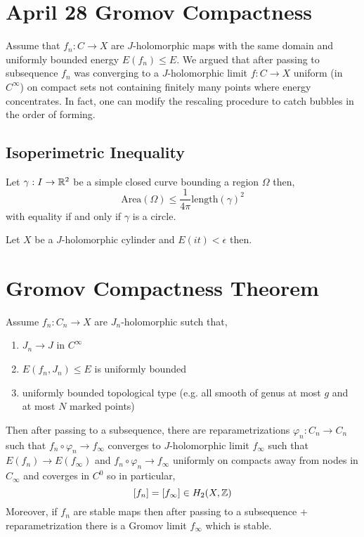 \documentclass[12pt]{article}
\begin{document}
\section{April 28 Gromov Compactness}

Assume that $f_n : C \to X$ are $J$-holomorphic maps with the same domain and uniformly bounded energy $E(f_n) \le E$. We argued that after passing to subsequence $f_n$ was converging to a $J$-holomorphic limit $f : C \to X$ uniform (in $C^\infty$) on compact sets not containing finitely many points where energy concentrates. In fact, one can modify the rescaling procedure to catch bubbles in the order of forming. 

\subsection{Isoperimetric Inequality}

\begin{thm}
Let $\gamma : I \to \mathbb{R}^2$ be a simple closed curve bounding a region $\Omega$ then,
\[ \mathrm{Area}(\Omega) \le \frac{1}{4 \pi} \mathrm{length}(\gamma)^2 \]
with equality if and only if $\gamma$ is a circle.
\end{thm}

\begin{thm}
Let $X$ be a $J$-holomorphic cylinder and $E(it) < \epsilon$ then.
\end{thm}

\section{Gromov Compactness Theorem}

Assume $f_n : C_n \to X$ are $J_n$-holomorphic sutch that,
\begin{enumerate}
\item $J_n \to J$ in $C^\infty$
\item $E(f_n, J_n) \le E$ is uniformly bounded
\item uniformly bounded topological type (e.g. all smooth of genus at most $g$ and at most $N$ marked points)
\end{enumerate}

Then after passing to a subsequence, there are reparametrizations $\varphi_n : C_n \to C_n$ such that $f_n \circ \varphi_n \to f_\infty$ converges to $J$-holomorphic limit $f_\infty$ such that $E(f_n) \to E(f_\infty)$ and $f_n \circ \varphi_n \to f_\infty$ uniformly on compacts away from nodes in $C_\infty$ and coverges in $C^0$ so in particular,
\[ [f_n] = [f_\infty] \in H_2(X, \mathbb{Z}) \]
Moreover, if $f_n$ are stable maps then after passing to a subsequence + reparametrization there is a Gromov limit $f_\infty$ which is stable.
\end{document}
